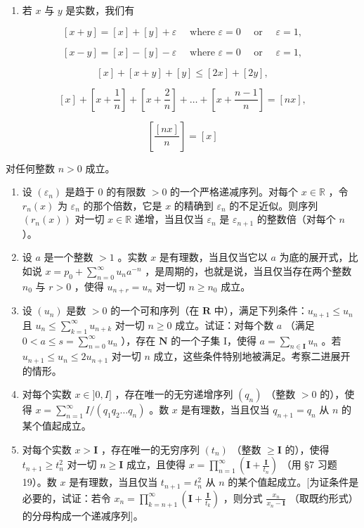 \BourbakiExerciseGroup

\begin{enumerate}
\def\labelenumi{\arabic{enumi})}
\tightlist
\item
若 \(x\) 与 \(y\) 是实数，我们有
\end{enumerate}

\[
[ x + y ] = [ x ] + [ y ] + \varepsilon \quad \text { where } \varepsilon = 0 \quad \text { or } \quad \varepsilon = 1,
\]

\[
[ x - y ] = [ x ] - [ y ] - \varepsilon \quad \text { where } \varepsilon = 0 \quad \text { or } \quad \varepsilon = 1,
\]

\[
[ x ] + [ x + y ] + [ y ] \leqslant [ 2 x ] + [ 2 y ],
\]

\[
[ x ] + \left[ x + \frac {1}{n} \right] + \left[ x + \frac {2}{n} \right] + \dots + \left[ x + \frac {n - 1}{n} \right] = [ n x ],
\]

\[
\left[ \frac {[ n x ]}{n} \right] = [ x ]
\]

对任何整数 \(n > 0\) 成立。

\begin{enumerate}
\def\labelenumi{\arabic{enumi})}
\setcounter{enumi}{1}
\item
设 \((\varepsilon_{n})\) 是趋于 0 的有限数 \(>0\) 的一个严格递减序列。对每个 \(x \in \mathbb{R}\) ，令 \(r_{n}(x)\) 为 \(\varepsilon_{n}\) 的那个倍数，它是 \(x\) 的精确到 \(\varepsilon_{n}\) 的不足近似。则序列 \((r_{n}(x))\) 对一切 \(x \in \mathbb{R}\) 递增，当且仅当 \(\varepsilon_{n}\) 是 \(\varepsilon_{n+1}\) 的整数倍（对每个 \(n\) ）。
\item
设 \(a\) 是一个整数 \(> 1\) 。实数 \(x\) 是有理数，当且仅当它以 \(a\) 为底的展开式，比如说 \(x = p_0 + \sum_{n=0}^{\infty} u_n a^{-n}\) ，是周期的，也就是说，当且仅当存在两个整数 \(n_0\) 与 \(r > 0\) ，使得 \(u_{n+r} = u_n\) 对一切 \(n \geqslant n_0\) 成立。
\item
设 \((u_{n})\) 是数 \(>0\) 的一个可和序列（在 \(\mathbf{R}\) 中），满足下列条件：\(u_{n+1} \leqslant u_{n}\) 且 \(u_{n} \leqslant \sum_{k=1}^{\infty} u_{n+k}\) 对一切 \(n \geqslant 0\) 成立。试证：对每个数 \(a\) （满足 \(0 < a \leqslant s = \sum_{n=0}^{\infty} u_{n}\) ），存在 \(\mathbf{N}\) 的一个子集 I，使得 \(a = \sum_{n \in \mathbf{I}} u_{n}\) 。若 \(u_{n+1} \leqslant u_{n} \leqslant 2u_{n+1}\) 对一切 \(n\) 成立，这些条件特别地被满足。考察二进展开的情形。
\item
对每个实数 \(x \in ]0, I]\) ，存在唯一的无穷递增序列 \((q_n)\) （整数 \(> 0\) 的），使得 \(x = \sum_{n=1}^{\infty} I / (q_1 q_2 \ldots q_n)\) 。数 \(x\) 是有理数，当且仅当 \(q_{n+1} = q_n\) 从 \(n\) 的某个值起成立。
\item
对每个实数 \(x > \mathbf{I}\) ，存在唯一的无穷序列 \((t_n)\) （整数 \(\geqslant \mathbf{I}\) 的），使得 \(t_{n+1} \geqslant t_n^2\) 对一切 \(n \geqslant \mathbf{I}\) 成立，且使得 \(x = \prod_{n=1}^{\infty} \left( \mathbf{I} + \frac{\mathbf{I}}{t_n} \right)\) （用 §7 习题 19）。数 \(x\) 是有理数，当且仅当 \(t_{n+1} = t_n^2\) 从 \(n\) 的某个值起成立。{[}为证条件是必要的，试证：若令 \(x_n = \prod_{k=n+1}^{\infty} \left( \mathbf{I} + \frac{\mathbf{I}}{t_k} \right)\) ，则分式 \(\frac{x_n}{x_n - \mathbf{I}}\) （取既约形式）的分母构成一个递减序列{]}。
\end{enumerate}

